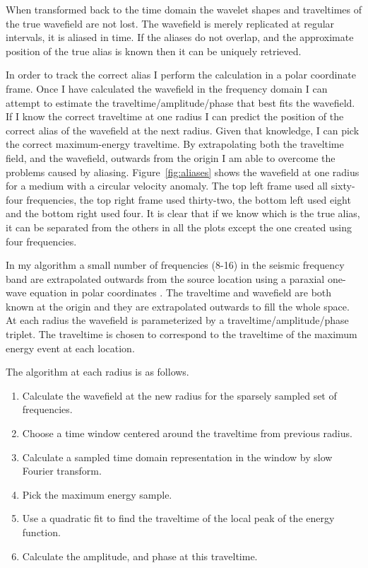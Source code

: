When transformed back to the time domain the wavelet shapes and
traveltimes of the true wavefield are not lost. The wavefield is
merely replicated at regular intervals, it is aliased in time. If the
aliases do not overlap, and the approximate position of the true alias
is known then it can be uniquely retrieved.


In order to track the correct alias I perform the calculation in a
polar coordinate frame. Once I have calculated the wavefield in the
frequency domain I can attempt to estimate the
traveltime/amplitude/phase that best fits the wavefield. If I know the
correct traveltime at one radius I can predict the position of the
correct alias of the wavefield at the next radius.  Given that
knowledge, I can pick the correct maximum-energy traveltime. By
extrapolating both the traveltime field, and the wavefield, outwards
from the origin I am able to overcome the problems caused by aliasing.
Figure~\ref{fig:aliases} shows the wavefield at one radius for a medium
with a circular velocity anomaly. The top left frame used all
sixty-four frequencies, the top right frame used thirty-two, the
bottom left used eight and the bottom right used four. It is clear
that if we know which is the true alias, it can be separated from the
others in all the plots except the one created using four frequencies.

In my algorithm a small number of frequencies (8-16) in the seismic
frequency band are extrapolated outwards from the source location
using a paraxial one-wave equation in polar coordinates
\cite{Nichols.sep.77.367}.  The traveltime and wavefield are both
known at the origin and they are extrapolated outwards to fill the
whole space. At each radius the wavefield is parameterized by a
traveltime/amplitude/phase triplet.  The traveltime is chosen to
correspond to the traveltime of the maximum energy event at each
location.

 The algorithm at each radius is
as follows.
\begin{enumerate}
\item Calculate the wavefield at the new radius for the sparsely
  sampled set of frequencies.
\item Choose a time window centered around the traveltime from previous
  radius.
\item Calculate a sampled time domain representation in the window by
  slow Fourier transform.
\item Pick the maximum energy sample.
\item Use a quadratic fit to find the traveltime of the local peak of
  the energy function.
\item Calculate the amplitude, and phase at this traveltime.
\end{enumerate}

